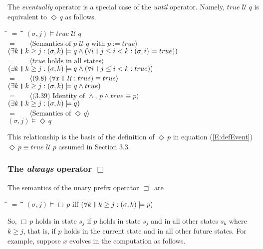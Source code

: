 \documentclass[fleqn, leqno]{article}
\newcommand{\lgap}{2pt}                             %
\newcommand{\mymathindent}{24pt}                    %
\newcommand{\Until}{\;\mathcal{U}\;}
\newcommand{\Event}{\Diamond\,}
\newcommand{\Always}{\Box\,}
\newcommand{\myqedtab}{\hspace{388.5pt}}              %
\newcommand{\thedr}{\rule[-.25ex]{.32mm}{1.75ex}}   %
\newcommand{\dr}{\;\,\thedr\,\;}                    %
\newcommand{\rb}{:}                                 %
\newcommand{\all}{\forall}                          %
\newcommand{\ext}{\exists}                          %
\newcommand{\Gll} {\langle}                         %
\newcommand{\Ggg} {\rangle}                         %
\newcommand{\Hint}[1]     {\ \ \ $\Gll              \mbox{#1} \Ggg$ }   %
\begin{document}
The \textit{eventually} operator is a special case of the \textit{until} operator.
Namely, $true \Until q$ is equivalent to $\Event q$ as follows.

\begin{tabbing}
\hspace{\mymathindent} \= $= \;$ \= \myqedtab \= \kill
	\> \>   $(\sigma, j) \models true\Until q$\\[\lgap]
	\> $=$  \>  \Hint{Semantics of $p\Until q$ with $p:=true$}\\[\lgap]
	\> \>   $(\ext k \dr k \ge j \rb (\sigma,k) \models q \land (\all i \dr j\le i < k \rb (\sigma,i) \models true))$\\[\lgap]
	\> $=$  \>  \Hint{$true$ holds in all states}\\[\lgap]
	\> \>   $(\ext k \dr k \ge j \rb (\sigma,k) \models q \land (\all i \dr j\le i < k \rb true))$\\[\lgap]
	\> $=$  \>  \Hint{(9.8) $(\all x\dr R\rb true)\equiv true$}\\[\lgap]
	\> \>   $(\ext k \dr k \ge j \rb (\sigma,k) \models q \land true)$\\[\lgap]
	\> $=$  \>  \Hint{(3.39) Identity of $\land$, $p \land true \equiv p$}\\[\lgap]
	\> \>   $(\ext k \dr k \ge j \rb (\sigma,k) \models q)$\\[\lgap]
	\> $=$  \>  \Hint{Semantics of $\Event q$}\\[\lgap]
	\> \>   $(\sigma, j) \models \Event q$
\end{tabbing}

This relationship is the basis of the definition of $\Event p$ in equation (\ref{E:defEvent}) $\Event p \equiv true \Until p$
assumed in Section 3.3.

\subsubsection*{The \textit{always} operator $\Always$}

The semantics of the unary prefix operator $\Always$ are

\begin{tabbing}
\hspace{\mymathindent} \= $= \;$ \= \myqedtab \= \kill
  \> $(\sigma, j) \models \Always p$ \quad iff \quad $(\all k \dr k \ge j \rb (\sigma,k) \models p)$
\end{tabbing}

So, $\Always p$ holds in state $s_j$ if $p$ holds in state $s_j$ and in all other states $s_k$ where $k\ge j$,
that is, if $p$ holds in the current state and in all other future states.
For example, suppose $x$ evolves in the computation as follows.\\
\end{document}
